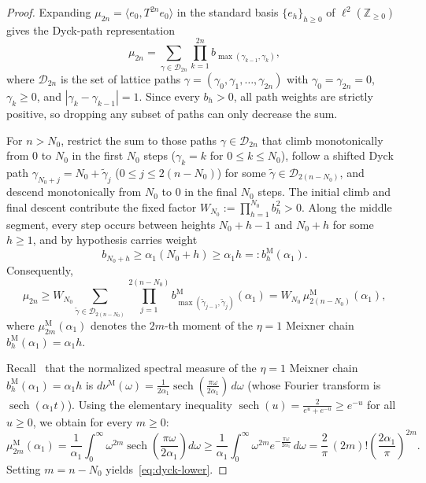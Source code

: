 \documentclass[11pt,a4paper]{article}
\numberwithin{equation}{section}
\theoremstyle{plain}
\theoremstyle{definition}
\newcommand{\sech}{\operatorname{sech}}
\begin{document}
\begin{proof}
Expanding $\mu_{2n} = \langle e_0, T^{2n} e_0\rangle$ in the standard basis $\{e_h\}_{h\ge 0}$ of $\ell^2(\mathbb{Z}_{\ge 0})$ gives the Dyck-path representation
\[
  \mu_{2n} = \sum_{\gamma\in\mathcal{D}_{2n}} \prod_{k=1}^{2n} b_{\max(\gamma_{k-1},\gamma_k)},
\]
where $\mathcal{D}_{2n}$ is the set of lattice paths $\gamma = (\gamma_0,\gamma_1,\dots,\gamma_{2n})$ with $\gamma_0 = \gamma_{2n} = 0$, $\gamma_k \ge 0$, and $|\gamma_k - \gamma_{k-1}| = 1$. Since every $b_h > 0$, all path weights are strictly positive, so dropping any subset of paths can only decrease the sum.

For $n > N_0$, restrict the sum to those paths $\gamma\in\mathcal{D}_{2n}$ that climb monotonically from $0$ to $N_0$ in the first $N_0$ steps ($\gamma_k = k$ for $0\le k\le N_0$), follow a shifted Dyck path $\gamma_{N_0+j} = N_0 + \tilde{\gamma}_j$ ($0\le j\le 2(n-N_0)$) for some $\tilde{\gamma}\in\mathcal{D}_{2(n-N_0)}$, and descend monotonically from $N_0$ to $0$ in the final $N_0$ steps. The initial climb and final descent contribute the fixed factor $W_{N_0} := \prod_{h=1}^{N_0} b_h^2 > 0$. Along the middle segment, every step occurs between heights $N_0 + h - 1$ and $N_0 + h$ for some $h\ge 1$, and by hypothesis carries weight
\[
  b_{N_0+h} \ge \alpha_1(N_0 + h) \ge \alpha_1 h =: b_h^{\mathrm{M}}(\alpha_1).
\]
Consequently,
\[
  \mu_{2n} \ge W_{N_0}\sum_{\tilde{\gamma}\in\mathcal{D}_{2(n-N_0)}} \prod_{j=1}^{2(n-N_0)} b_{\max(\tilde{\gamma}_{j-1},\tilde{\gamma}_j)}^{\mathrm{M}}(\alpha_1)
  = W_{N_0}\,\mu_{2(n-N_0)}^{\mathrm{M}}(\alpha_1),
\]
where $\mu_{2m}^{\mathrm{M}}(\alpha_1)$ denotes the $2m$-th moment of the $\eta=1$ Meixner chain $b_h^{\mathrm{M}}(\alpha_1) = \alpha_1 h$.

Recall~\cite{Chihara1978,Parker2019} that the normalized spectral measure of the $\eta=1$ Meixner chain $b_h^{\mathrm{M}}(\alpha_1) = \alpha_1 h$ is $d\nu^{\mathrm{M}}(\omega) = \frac{1}{2\alpha_1}\sech(\frac{\pi\omega}{2\alpha_1})\,d\omega$ (whose Fourier transform is $\sech(\alpha_1 t)$). Using the elementary inequality $\sech(u) = \frac{2}{e^u+e^{-u}} \ge e^{-u}$ for all $u\ge 0$, we obtain for every $m\ge 0$:
\[
  \mu_{2m}^{\mathrm{M}}(\alpha_1)
  = \frac{1}{\alpha_1}\int_0^\infty \omega^{2m}\sech\!\left(\frac{\pi\omega}{2\alpha_1}\right)d\omega
  \ge \frac{1}{\alpha_1}\int_0^\infty \omega^{2m} e^{-\frac{\pi\omega}{2\alpha_1}}\,d\omega
  = \frac{2}{\pi}\,(2m)!\left(\frac{2\alpha_1}{\pi}\right)^{2m}.
\]
Setting $m = n - N_0$ yields~\eqref{eq:dyck-lower}.
\end{proof}
\end{document}
